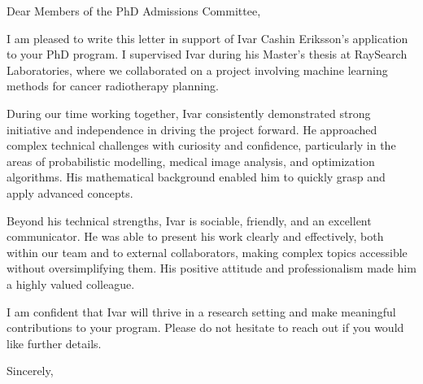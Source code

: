 \documentclass[11pt,a4paper]{letter}
\date{\today}
\begin{document}
\begin{letter}{}

\opening{Dear Members of the PhD Admissions Committee,}

I am pleased to write this letter in support of Ivar Cashin Eriksson's application to your PhD program. I supervised Ivar during his Master's thesis at RaySearch Laboratories, where we collaborated on a project involving machine learning methods for cancer radiotherapy planning.

During our time working together, Ivar consistently demonstrated strong initiative and independence in driving the project forward. He approached complex technical challenges with curiosity and confidence, particularly in the areas of probabilistic modelling, medical image analysis, and optimization algorithms. His mathematical background enabled him to quickly grasp and apply advanced concepts.

Beyond his technical strengths, Ivar is sociable, friendly, and an excellent communicator. He was able to present his work clearly and effectively, both within our team and to external collaborators, making complex topics accessible without oversimplifying them. His positive attitude and professionalism made him a highly valued colleague.

I am confident that Ivar will thrive in a research setting and make meaningful contributions to your program. Please do not hesitate to reach out if you would like further details.

\closing{Sincerely,}

\end{letter}
\end{document}
